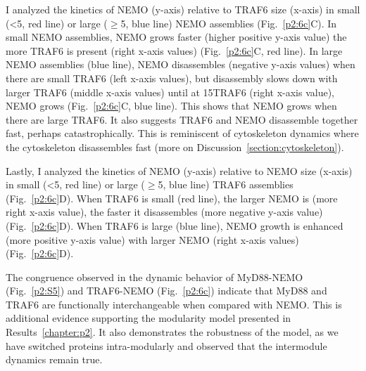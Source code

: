 I analyzed the kinetics of NEMO (y-axis) relative to TRAF6 size (x-axis) in small (<5\times, red line) or large ($\geq$5\times, blue line) NEMO assemblies (Fig.~\ref{p2:6c}C). In small NEMO assemblies, NEMO grows faster (higher positive y-axis value) the more TRAF6 is present (right x-axis values)  (Fig.~\ref{p2:6c}C, red line). In large NEMO assemblies (blue line), NEMO disassembles (negative y-axis values) when there are small TRAF6 (left x-axis values), but disassembly slows down with larger TRAF6 (middle x-axis values) until at 15\times TRAF6 (right x-axis value), NEMO grows (Fig.~\ref{p2:6c}C, blue line). This shows that NEMO grows when there are large TRAF6. It also suggests TRAF6 and NEMO disassemble together fast, perhaps catastrophically. This is reminiscent of cytoskeleton dynamics where the cytoskeleton disassembles fast (more on Discussion~\ref{section:cytoskeleton}).

Lastly, I analyzed the kinetics of NEMO (y-axis) relative to NEMO size (x-axis) in small (<5\times, red line) or large ($\geq$5\times, blue line) TRAF6 assemblies (Fig.~\ref{p2:6c}D). When TRAF6 is small (red line), the larger NEMO is (more right x-axis value), the faster it disassembles (more negative y-axis value) (Fig.~\ref{p2:6c}D). When TRAF6 is large (blue line), NEMO growth is enhanced (more positive y-axis value) with larger NEMO (right x-axis values) (Fig.~\ref{p2:6c}D).

The congruence observed in the dynamic behavior of MyD88-NEMO (Fig.~\ref{p2:S5}) and TRAF6-NEMO (Fig.~\ref{p2:6c}) indicate that MyD88 and TRAF6 are functionally interchangeable when compared with NEMO. This is additional evidence supporting the modularity model presented in Results~\ref{chapter:p2}. It also demonstrates the robustness of the model, as we have switched proteins intra-modularly and observed that the intermodule dynamics remain true.


